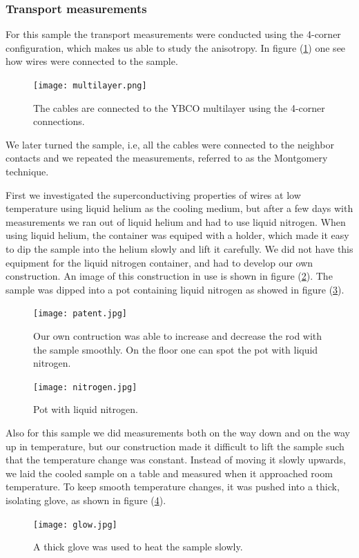 \documentclass{comjnl}
\begin{document}
\subsubsection{Transport measurements}
For this sample the transport measurements were conducted using the 4-corner configuration, which makes us able to study the anisotropy. In figure (\ref{fig:multilayer}) one see how wires were connected to the sample.
\begin{figure}[h]
\centering
\texttt{[image: multilayer.png]}
\caption{The cables are connected to the YBCO multilayer using the 4-corner connections. \label{fig:multilayer}}
\end{figure}
We later turned the sample, i.e, all the cables were connected to the neighbor contacts and we repeated the measurements, referred to as the Montgomery technique. 

First we investigated the superconductiving properties of wires at low temperature using liquid helium as the cooling medium, but after a few days with measurements we ran out of liquid helium and had to use liquid nitrogen. When using liquid helium, the container was equiped with a holder, which made it easy to dip the sample into the helium slowly and lift it carefully. We did not have this equipment for the liquid nitrogen container, and had to develop our own construction. An image of this construction in use is shown in figure (\ref{fig:patent}). The sample was dipped into a pot containing liquid nitrogen as showed in figure (\ref{fig:nitrogen}). 
\begin{figure}[h]
\centering
\texttt{[image: patent.jpg]}
\caption{Our own contruction was able to increase and decrease the rod with the sample smoothly. On the floor one can spot the pot with liquid nitrogen. \label{fig:patent}}
\end{figure}
\begin{figure}[h]
\centering
\texttt{[image: nitrogen.jpg]}
\caption{Pot with liquid nitrogen. \label{fig:nitrogen}}
\end{figure}
Also for this sample we did measurements both on the way down and on the way up in temperature, but our construction made it difficult to lift the sample such that the temperature change was constant. Instead of moving it slowly upwards, we laid the cooled sample on a table and measured when it approached room temperature. To keep smooth temperature changes, it was pushed into a thick, isolating glove, as shown in figure (\ref{fig:glove}).
\begin{figure}[h]
\centering
\texttt{[image: glow.jpg]}
\caption{A thick glove was used to heat the sample slowly. \label{fig:glove}}
\end{figure}
\end{document}
